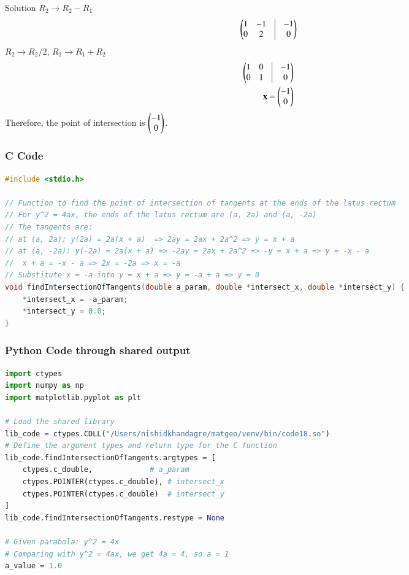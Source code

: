 \documentclass{beamer}
\begin{document}
\begin{frame}{Solution}
$R_2\rightarrow R_2-R_1$
   \begin{align}
   \myvec{
   1 & -1 & \vrule & -1\\ 0 & 2 & \vrule & 0
   }
   \end{align}
   $R_2\rightarrow R_2/2$, $R_1\rightarrow R_1+R_2$
   \begin{align}
   \myvec{
   1 & 0 & \vrule & -1\\ 0 & 1 & \vrule & 0
   }\\
   \vec{x}=\myvec{-1\\0}
   \end{align}
Therefore, the point of intersection is $\begin{pmatrix}-1 \\ 0\end{pmatrix}$.
\end{frame}

\begin{frame}[fragile]
\frametitle{C Code}
\begin{lstlisting}[language=C]
#include <stdio.h>

// Function to find the point of intersection of tangents at the ends of the latus rectum
// For y^2 = 4ax, the ends of the latus rectum are (a, 2a) and (a, -2a)
// The tangents are:
// at (a, 2a): y(2a) = 2a(x + a)  => 2ay = 2ax + 2a^2 => y = x + a
// at (a, -2a): y(-2a) = 2a(x + a) => -2ay = 2ax + 2a^2 => -y = x + a => y = -x - a
//  x + a = -x - a => 2x = -2a => x = -a
// Substitute x = -a into y = x + a => y = -a + a => y = 0
void findIntersectionOfTangents(double a_param, double *intersect_x, double *intersect_y) {
    *intersect_x = -a_param;
    *intersect_y = 0.0;
}
\end{lstlisting}
\end{frame}

\begin{frame}[fragile]
\frametitle{Python Code through shared output}
\begin{lstlisting}[language=Python]
import ctypes
import numpy as np
import matplotlib.pyplot as plt

# Load the shared library
lib_code = ctypes.CDLL("/Users/nishidkhandagre/matgeo/venv/bin/code18.so")
# Define the argument types and return type for the C function
lib_code.findIntersectionOfTangents.argtypes = [
    ctypes.c_double,             # a_param
    ctypes.POINTER(ctypes.c_double), # intersect_x
    ctypes.POINTER(ctypes.c_double)  # intersect_y
]
lib_code.findIntersectionOfTangents.restype = None

# Given parabola: y^2 = 4x
# Comparing with y^2 = 4ax, we get 4a = 4, so a = 1
a_value = 1.0
\end{lstlisting}
\end{frame}
\end{document}
